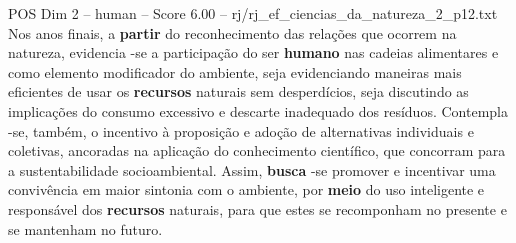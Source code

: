 \begin{textsample}{POS Dim 2 – human – Score 6.00 – rj/rj\_ef\_ciencias\_da\_natureza\_2\_p12.txt}  \label{ex:f2_pos_019}
Nos anos finais, a \textbf{partir} do reconhecimento das relações que ocorrem na natureza, evidencia -se a participação do ser \textbf{humano} nas cadeias alimentares e como elemento modificador do ambiente, seja evidenciando maneiras mais eficientes de usar os \textbf{recursos} naturais sem desperdícios, seja discutindo as implicações do consumo excessivo e descarte inadequado dos resíduos.
Contempla -se, também, o incentivo à proposição e adoção de alternativas individuais e coletivas, ancoradas na aplicação do conhecimento científico, que concorram para a sustentabilidade socioambiental.
Assim, \textbf{busca} -se promover e incentivar uma convivência em maior sintonia com o ambiente, por \textbf{meio} do uso inteligente e responsável dos \textbf{recursos} naturais, para que estes se recomponham no presente e se mantenham no futuro.

\end{textsample}
